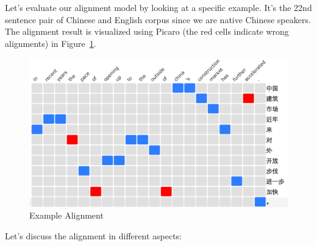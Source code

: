 \documentclass{article}
\begin{document}
Let's evaluate our alignment model by looking at a specific example. It's the 22nd sentence pair of Chinese and English corpus since we are native Chinese speakers. The alignment result is visualized using Picaro (the red cells indicate wrong alignments) in Figure~\ref{fig:alignment}.

\begin{figure}[!htb]
\centering
\includegraphics[width=.9\textwidth]{alignment}
\caption{Example Alignment}
\label{fig:alignment}
\end{figure}

Let's discuss the alignment in different aspects:
\end{document}
